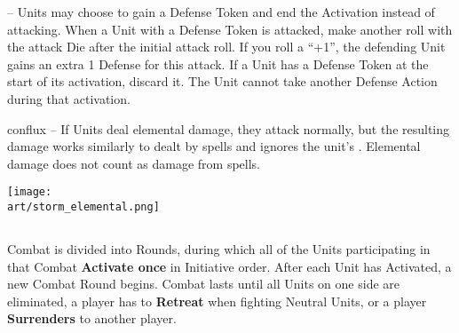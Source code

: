 \begin{multicols*}{2}
\textbf{}  – Units may choose to gain a Defense Token and end the Activation instead of attacking.
When a Unit with a Defense Token is attacked, make another roll with the attack Die after the initial attack roll.
If you roll a ``+1'', the defending Unit gains an extra 1 Defense for this attack.
If a Unit has a Defense Token at the start of its activation, discard it.
The Unit cannot take another Defense Action during that activation.\par
\begin{expansion}{conflux}
  \textbf{} – If Units deal elemental damage, they attack normally, but the resulting damage works similarly to  dealt by spells and ignores the unit's .
  Elemental damage does not count as damage from spells.
\end{expansion}

\vspace*{\fill}
\begin{center}
  \texttt{[image: \\art/storm\_elemental.png]}
\end{center}

\subsection*{}
Combat is divided into Rounds, during which all of the Units participating in that Combat \textbf{Activate once} in Initiative order.
After each Unit has Activated, a new Combat Round begins.
Combat lasts until all Units on one side are eliminated, a player has to \textbf{Retreat} when fighting Neutral Units, or a player \textbf{Surrenders} to another player.


\end{multicols*}
